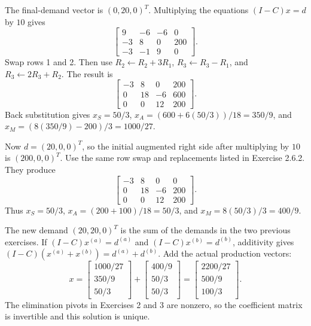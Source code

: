 The final-demand vector is $(0,20,0)^T$. Multiplying the equations
$(I-C)x=d$ by $10$ gives
\[\left[\begin{array}{rrr|r}9&-6&-6&0\\-3&8&0&200\\-3&-1&9&0\end{array}\right].\]
Swap rows 1 and 2. Then use $R_2\leftarrow R_2+3R_1$,
$R_3\leftarrow R_3-R_1$, and $R_3\leftarrow2R_3+R_2$.
The result is
\[\left[\begin{array}{rrr|r}-3&8&0&200\\0&18&-6&600\\0&0&12&200\end{array}\right].\]
Back substitution gives $x_S=50/3$,
$x_A=(600+6(50/3))/18=350/9$, and
$x_M=(8(350/9)-200)/3=1000/27$.

Now $d=(20,0,0)^T$, so the initial augmented right side after
multiplying by $10$ is $(200,0,0)^T$.
Use the same row swap and replacements listed in Exercise 2.6.2.
They produce
\[\left[\begin{array}{rrr|r}-3&8&0&0\\0&18&-6&200\\0&0&12&200\end{array}\right].\]
Thus $x_S=50/3$, $x_A=(200+100)/18=50/3$, and
$x_M=8(50/3)/3=400/9$.

The new demand $(20,20,0)^T$ is the sum of the demands in the two
previous exercises. If $(I-C)x^{(a)}=d^{(a)}$ and
$(I-C)x^{(b)}=d^{(b)}$, additivity gives
$(I-C)(x^{(a)}+x^{(b)})=d^{(a)}+d^{(b)}$.
Add the actual production vectors:
\[x=\begin{bmatrix}1000/27\\350/9\\50/3\end{bmatrix}
+\begin{bmatrix}400/9\\50/3\\50/3\end{bmatrix}
=\begin{bmatrix}2200/27\\500/9\\100/3\end{bmatrix}.\]
The elimination pivots in Exercises 2 and 3 are nonzero, so the
coefficient matrix is invertible and this solution is unique.

